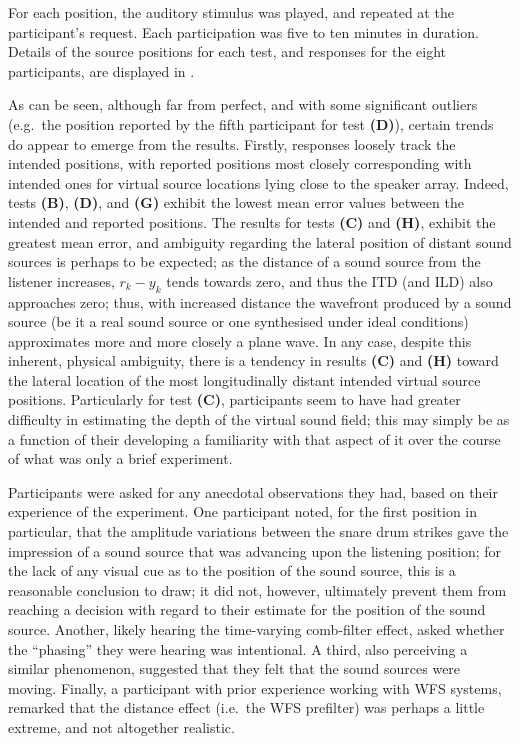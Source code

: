 For each position, the auditory stimulus was played, and repeated at the
participant's request.
Each participation was five to ten minutes in duration.
Details of the source positions for each test, and responses for the eight
participants, are displayed in .

As can be seen, although far from perfect, and with some significant
outliers (e.g.\ the position reported by the fifth participant for test
\textbf{(D)}), certain trends do appear to emerge from the results.
Firstly, responses loosely track the intended positions, with reported
positions most closely corresponding with intended ones for virtual source
locations lying close to the speaker array.
Indeed, tests \textbf{(B)}, \textbf{(D)}, and \textbf{(G)} exhibit the lowest
mean error values between the intended and reported positions.
The results for tests \textbf{(C)} and \textbf{(H)}, exhibit the greatest mean
error, and ambiguity regarding the lateral position of distant sound sources is
perhaps to be expected;
as the distance of a sound source from the listener increases, $r_k - y_k$
tends towards zero, and thus the ITD (and ILD) also approaches zero;
thus, with increased distance the wavefront produced by a sound source (be it a
real sound source or one synthesised under ideal conditions) approximates more
and more closely a plane wave.
In any case, despite this inherent, physical ambiguity, there is a tendency
in results \textbf{(C)} and \textbf{(H)} toward the lateral location of the most
longitudinally distant intended virtual source positions.
Particularly for test \textbf{(C)}, participants seem to have had greater
difficulty in estimating the depth of the virtual sound field; this may simply
be as a function of their developing a familiarity with that aspect of it over
the course of what was only a brief experiment.

Participants were asked for any anecdotal observations they had, based on their
experience of the experiment.
One participant noted, for the first position in particular, that the amplitude
variations between the snare drum strikes gave the impression of a sound source
that was advancing upon the listening position; for the lack of any visual cue
as to the position of the sound source, this is a reasonable conclusion to draw;
it did not, however, ultimately prevent them from reaching a decision with
regard to their estimate for the position of the sound source.
Another, likely hearing the time-varying comb-filter effect, asked whether the
``phasing'' they were hearing was intentional.
A third, also perceiving a similar phenomenon, suggested that they
felt that the sound sources were moving.
Finally, a participant with prior experience working with WFS systems, remarked
that the distance effect (i.e.\ the WFS prefilter) was perhaps a little extreme,
and not altogether realistic.

